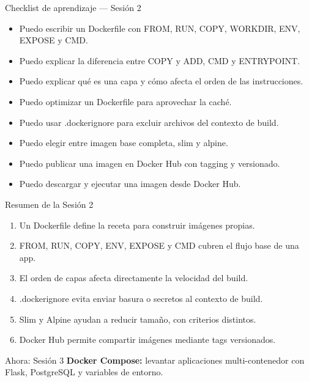 \documentclass[aspectratio=169]{beamer}
\begin{document}
\begin{frame}{Checklist de aprendizaje — Sesión 2}
  \begin{itemize}
    \item Puedo escribir un Dockerfile con FROM, RUN, COPY, WORKDIR, ENV, EXPOSE y CMD.
    \item Puedo explicar la diferencia entre COPY y ADD, CMD y ENTRYPOINT.
    \item Puedo explicar qué es una capa y cómo afecta el orden de las instrucciones.
    \item Puedo optimizar un Dockerfile para aprovechar la caché.
    \item Puedo usar .dockerignore para excluir archivos del contexto de build.
    \item Puedo elegir entre imagen base completa, slim y alpine.
    \item Puedo publicar una imagen en Docker Hub con tagging y versionado.
    \item Puedo descargar y ejecutar una imagen desde Docker Hub.
  \end{itemize}
\end{frame}

\begin{frame}{Resumen de la Sesión 2}
  \footnotesize
  \begin{enumerate}
    \item Un Dockerfile define la receta para construir imágenes propias.
    \item FROM, RUN, COPY, ENV, EXPOSE y CMD cubren el flujo base de una app.
    \item El orden de capas afecta directamente la velocidad del build.
    \item .dockerignore evita enviar basura o secretos al contexto de build.
    \item Slim y Alpine ayudan a reducir tamaño, con criterios distintos.
    \item Docker Hub permite compartir imágenes mediante tags versionados.
  \end{enumerate}
  \vspace{0.08cm}
  \begin{alertblock}{Ahora: Sesión 3}
    \textbf{Docker Compose:} levantar aplicaciones multi-contenedor con Flask, PostgreSQL y variables de entorno.
  \end{alertblock}
\end{frame}

\end{document}
